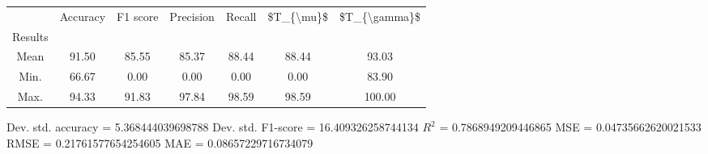 \begin{tabular}{|c|c|c|c|c|c|c|}
\toprule
{} &  Accuracy &  F1 score &  Precision &  Recall &  \$T\_\{\textbackslash mu\}\$ &  \$T\_\{\textbackslash gamma\}\$ \\
Results &           &           &            &         &            &               \\
\hline
Mean    &     91.50 &     85.55 &      85.37 &   88.44 &      88.44 &         93.03 \\
Min.    &     66.67 &      0.00 &       0.00 &    0.00 &       0.00 &         83.90 \\
Max.    &     94.33 &     91.83 &      97.84 &   98.59 &      98.59 &        100.00 \\
\bottomrule
\end{tabular}

 Dev. std. accuracy = 5.368444039698788
 Dev. std. F1-score = 16.409326258744134
 $R^2$ = 0.7868949209446865
 MSE = 0.04735662620021533
 RMSE = 0.21761577654254605
 MAE = 0.08657229716734079